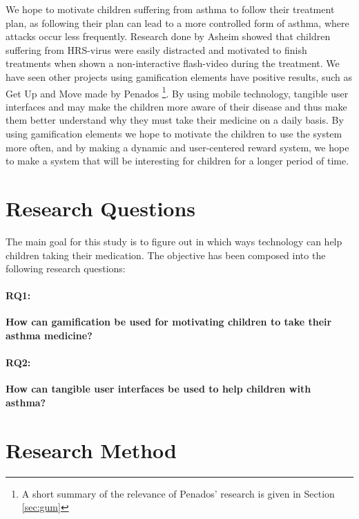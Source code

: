We hope to motivate children suffering from asthma to follow their treatment plan, as following their plan can lead to a more controlled form of asthma, where attacks occur less frequently\cite{ginasthma}. 
Research done by Asheim showed that children suffering from HRS-virus were easily distracted and motivated to finish treatments when shown a non-interactive flash-video during the treatment\cite{asheim2012konsept}. We have seen other projects using gamification elements have positive results, such as Get Up and Move made by Penados \etal{}\cite{penadosget}\footnote{A short summary of the relevance of Penados' research is given in Section \ref{sec:gum}}. 
By using mobile technology, tangible user interfaces and may make the children more aware of their disease and thus make them better understand why they must take their medicine on a daily basis. 
By using gamification elements we hope to motivate the children to use the system more often, and by making a dynamic and user-centered reward system, we hope to make a system that will be interesting for children for a longer period of time.  



\section{Research Questions}
\label{sec:researchquestions}
The main goal for this study is to figure out in which ways technology can help children taking their medication. The objective has been composed into the following research questions: 

\paragraph{RQ1:}
\textbf{How can gamification be used for motivating children to take their asthma medicine?}


\paragraph{RQ2:}
\textbf{How can tangible user interfaces be used to help children with asthma?}


\section{Research Method}
\label{sec:researchmethod}


